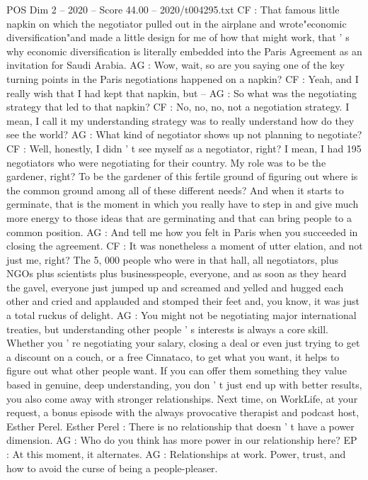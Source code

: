 \begin{textsample}{POS Dim 2 – 2020 – Score 44.00 – 2020/t004295.txt}
CF : That famous little napkin on which the negotiator pulled out in the airplane and wrote"economic diversification"and made a little design for me of how that might work, that ' s why economic diversification is literally embedded into the Paris Agreement as an invitation for Saudi Arabia.
AG : Wow, wait, so are you saying one of the key turning points in the Paris negotiations happened on a napkin?
CF : Yeah, and I really wish that I had kept that napkin, but -- AG : So what was the negotiating strategy that led to that napkin?
CF : No, no, no, not a negotiation strategy.
I mean, I call it my understanding strategy was to really understand how do they see the world?
AG : What kind of negotiator shows up not planning to negotiate?
CF : Well, honestly, I didn ' t see myself as a negotiator, right?
I mean, I had 195 negotiators who were negotiating for their country.
My role was to be the gardener, right?
To be the gardener of this fertile ground of figuring out where is the common ground among all of these different needs?
And when it starts to germinate, that is the moment in which you really have to step in and give much more energy to those ideas that are germinating and that can bring people to a common position.
AG : And tell me how you felt in Paris when you succeeded in closing the agreement.
CF : It was nonetheless a moment of utter elation, and not just me, right?
The 5, 000 people who were in that hall, all negotiators, plus NGOs plus scientists plus businesspeople, everyone, and as soon as they heard the gavel, everyone just jumped up and screamed and yelled and hugged each other and cried and applauded and stomped their feet and, you know, it was just a total ruckus of delight.
AG : You might not be negotiating major international treaties, but understanding other people ' s interests is always a core skill.
Whether you ' re negotiating your salary, closing a deal or even just trying to get a discount on a couch, or a free Cinnataco, to get what you want, it helps to figure out what other people want.
If you can offer them something they value based in genuine, deep understanding, you don ' t just end up with better results, you also come away with stronger relationships.
Next time, on WorkLife, at your request, a bonus episode with the always provocative therapist and podcast host, Esther Perel.
Esther Perel : There is no relationship that doesn ' t have a power dimension.
AG : Who do you think has more power in our relationship here?
EP : At this moment, it alternates.
AG : Relationships at work.
Power, trust, and how to avoid the curse of being a people-pleaser.

\end{textsample}
